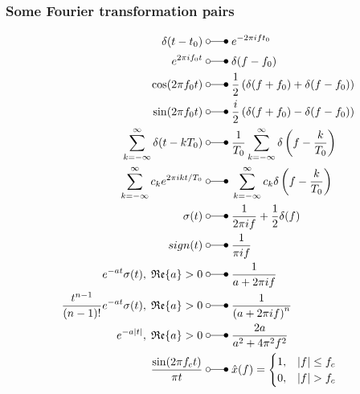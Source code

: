 \subsubsection{Some Fourier transformation pairs}
\begin{align*}
    \delta(t-t_0) \;                                                          & \laplace\;  e^{-2\pi ift_{0}}                                                          \\
    e^{2\pi if_0t} \;                                                         & \laplace\;  \delta(f-f_{0})                                                            \\
    \cos(2\pi f_0t) \;                                                        & \laplace\;  \frac{1}{2}\left(\delta(f+f_0)+\delta(f-f_0)\right)                        \\
    \sin(2\pi f_0t) \;                                                        & \laplace\;  \frac{i}{2}\left(\delta(f+f_0)-\delta(f-f_0)\right)                        \\
    \sum_{k=-\infty}^{\infty}\delta(t-kT_0) \;                                & \laplace\;  \frac{1}{T_0}\sum_{k=-\infty}^{\infty}\delta\left(f-\frac{k}{T_0}\right)   \\
    \sum_{k=-\infty}^{\infty}c_{k}e^{2\pi ikt/T_0} \;                         & \laplace\;  \sum_{k=-\infty}^{\infty}c_k\delta\left(f-\frac{k}{T_0}\right)             \\
    \sigma(t) \;                                                              & \laplace\;  \frac{1}{2\pi if}+\frac12\delta(f)                                         \\
    sign(t) \;                                                                & \laplace\;  \frac{1}{\pi if}                                                           \\
    e^{-at}\sigma(t),\;\mathfrak{Re}\{a\}>0 \;                                & \laplace\;  \frac{1}{a+2\pi if}                                                        \\
    \frac{t^{n-1}}{(n-1)!}e^{-at}\sigma(t),\;\mathfrak{Re}\{a\}>0 \;          & \laplace\;  \frac{1}{{(a+2\pi if)}^n}                                                  \\
    e^{-a|t|},\;\mathfrak{Re}\{a\}>0 \;                                       & \laplace\;  \frac{2a}{a^2+4\pi^2f^2}                                                   \\
    \frac{\sin(2\pi f_c t)}{\pi t} \;                                         & \laplace\;  \hat{x}(f) =\begin{cases}1,&|f|\leq f_c\\0,&|f|>f_c\end{cases}             \\

\end{align*}
